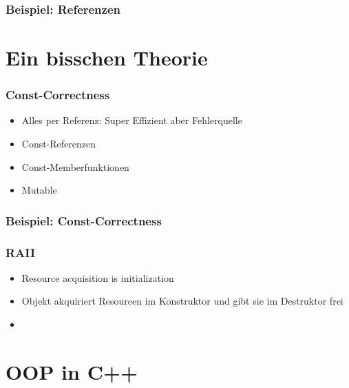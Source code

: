 \documentclass[aspectratio=169]{beamer}
\begin{document}
\begin{frame}
    \frametitle{Beispiel: Referenzen}
\end{frame}

\section{Ein bisschen Theorie}

\begin{frame}
    \frametitle{Const-Correctness}
    \begin{itemize}
        \item Alles per Referenz: Super Effizient aber Fehlerquelle
            \pause
        \item Const-Referenzen
            \pause
        \item Const-Memberfunktionen
            \pause
        \item Mutable
    \end{itemize}
\end{frame}

\begin{frame}
    \frametitle{Beispiel: Const-Correctness}
\end{frame}

\begin{frame}
    \frametitle{RAII}
    \begin{itemize}
        \item Resource acquisition is initialization
            \pause
        \item Objekt akquiriert Resourcen im Konstruktor und gibt sie im
            Destruktor frei
            \pause
        \item
            
    \end{itemize}
\end{frame}

\section{OOP in C++}
\end{document}
